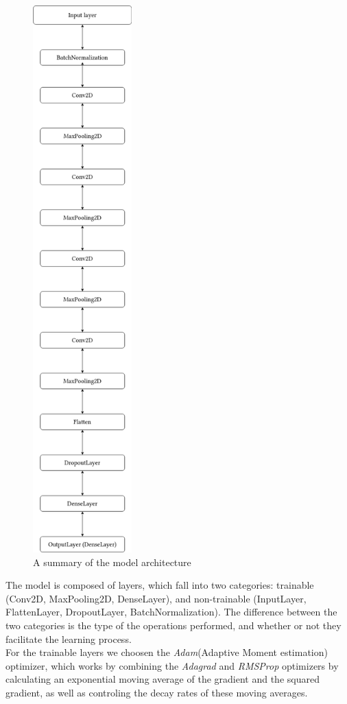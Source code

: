 \begin{figure}[H]
	\centering
	\includegraphics[width = 1.5in]{images/summary.png}
	\caption{A summary of the model architecture}
\label{model_arch}
\end{figure}

The model is composed of layers, which fall into two categories: trainable (Conv2D, MaxPooling2D, DenseLayer), and non-trainable
(InputLayer, FlattenLayer, DropoutLayer, BatchNormalization). The difference between the two categories is the type of the operations
performed, and whether or not they facilitate the learning process.\\

For the trainable layers we choosen the \textit{Adam}(Adaptive Moment estimation) optimizer, which works
by combining the \textit{Adagrad} and \textit{RMSProp} optimizers by calculating an exponential moving average
of the gradient and the squared gradient, as well as controling the decay rates of these moving averages.\cite{nnfs}

